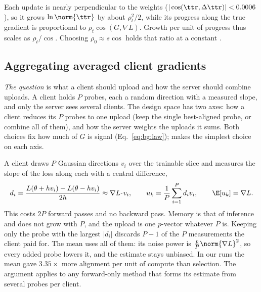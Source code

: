 Each update is nearly perpendicular to the weights
($|\cos(\ttr,\Delta\ttr)|<0.0006$), so it grows $\ln\norm{\ttr}$ by about
$\rho_t^2/2$, while its progress along the true gradient is proportional to
$\rho_t\cos(G,\nabla L)$. Growth per unit of progress thus scales as
$\rho_t/\cos$. Choosing $\rho_0\approx s\cos$ holds that ratio at a constant
.


\subsection{Aggregating averaged client gradients}
\label{sec:ft:agg}

\emph{The question} is what a client should upload and how the server should
combine uploads. A client holds $P$ probes, each a random direction with a
measured slope, and only the server sees several clients. The design space has
two axes: how a client reduces its $P$ probes to one upload (keep the single
best-aligned probe, or combine all of them), and how the server weights the
uploads it sums. Both choices fix how much of $G$ is signal
(Eq.~\eqref{eq:bg:law}); \sys makes the simplest choice on each axis.

A client draws $P$ Gaussian directions $v_i$ over the trainable slice and
measures the slope of the loss along each with a central difference,
\begin{equation}
d_i=\frac{L(\theta+hv_i)-L(\theta-hv_i)}{2h}\approx\nabla L\!\cdot\! v_i,\qquad
u_k=\frac1P\sum_{i=1}^{P}d_iv_i,\qquad\E[u_k]=\nabla L .
\label{eq:ft:fg}
\end{equation}
This costs $2P$ forward passes and no backward pass. Memory is that of
inference and does not grow with $P$, and the upload is one $p$-vector
whatever $P$ is. Keeping only the probe with the largest $|d_i|$ discards
$P-1$ of the $P$ measurements the client paid for. The mean uses all of them:
its noise power is $\tfrac{p}{P}\norm{\nabla L}^2$, so every added probe
lowers it, and the estimate stays unbiased. In our runs the mean gave
$3.35\times$ more alignment per unit of compute than selection. The argument
applies to any forward-only method that forms its estimate from several
probes per client.

